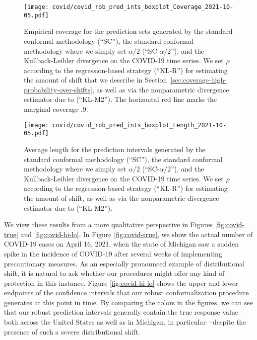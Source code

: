 \begin{figure}[ht]
  \centering
  \texttt{[image: covid/covid\_rob\_pred\_ints\_boxplot\_Coverage\_2021-10-05.pdf]}
  \caption{Empirical coverage for the prediction sets generated by the standard conformal methodology (``SC''), the standard conformal methodology where we simply set $\alpha/2$ (``SC-$\alpha/2$''), and the Kullback-Leibler divergence on the COVID-19 time series.  We set $\rho$ according to the regression-based strategy (``KL-R'') for estimating the amount of shift that we describe in Section~\ref{sec:coverage-high-probability-over-shifts}, as well as via the nonparametric divergence estimator due to \citet{NguyenWaJo10} (``KL-M2'').  The horizontal red line marks the marginal coverage $.9$.}
  \label{fig:covid-coverage}
\end{figure}

\begin{figure}[ht]
  \centering
  \texttt{[image: covid/covid\_rob\_pred\_ints\_boxplot\_Length\_2021-10-05.pdf]}
  \caption{Average length for the prediction intervals generated by the standard conformal methodology (``SC''), the standard conformal methodology where we simply set $\alpha/2$ (``SC-$\alpha/2$''), and the Kullback-Leibler divergence on the COVID-19 time series.  We set $\rho$ according to the regression-based strategy (``KL-R'') for estimating the amount of shift, as well as via the nonparametric divergence estimator due to \citet{NguyenWaJo10} (``KL-M2'').}
  \label{fig:covid-size}
\end{figure}

We view these results from a more qualitative perspective in Figures \ref{fig:covid-true} and \ref{fig:covid-hi-lo}.  In Figure \ref{fig:covid-true}, we show the actual number of COVID-19 cases on April 16, 2021, when the state of Michigan saw a sudden spike in the incidence of COVID-19 after several weeks of implementing precautionary measures.  As an especially pronounced example of distributional shift, it is natural to ask whether our procedures might offer any kind of protection in this instance.  Figure \ref{fig:covid-hi-lo} shows the upper and lower endpoints of the confidence intervals that our robust conformalization procedure generates at this point in time.  By comparing the colors in the figures, we can see that our robust prediction intervals generally contain the true response value both across the United States as well as in Michigan, in particular---despite the presence of such a severe distributional shift.

